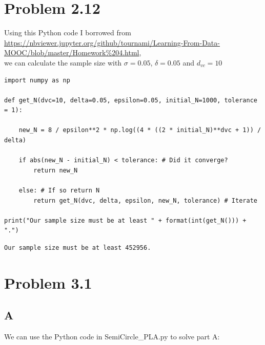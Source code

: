 \documentclass[a4paper]{article}
\begin{document}
\newpage

\section{Problem 2.12}
Using this Python code I borrowed from \\ \url{https://nbviewer.jupyter.org/github/tournami/Learning-From-Data-MOOC/blob/master/Homework\%204.html}, \\
we can calculate the sample size with $\sigma = 0.05$, $\delta = 0.05$ and $d_{vc} = 10$
\begin{lstlisting}[frame=single]
import numpy as np

def get_N(dvc=10, delta=0.05, epsilon=0.05, initial_N=1000, tolerance = 1):
    
    new_N = 8 / epsilon**2 * np.log((4 * ((2 * initial_N)**dvc + 1)) / delta)
    
    if abs(new_N - initial_N) < tolerance: # Did it converge?
        return new_N
          
    else: # If so return N
        return get_N(dvc, delta, epsilon, new_N, tolerance) # Iterate

print("Our sample size must be at least " + format(int(get_N())) + ".")
\end{lstlisting}

\begin{lstlisting}
Our sample size must be at least 452956.
\end{lstlisting}

\newpage

\section{Problem 3.1}
\subsection{A}
We can use the Python code in SemiCircle\_PLA.py to solve part A:
\end{document}
